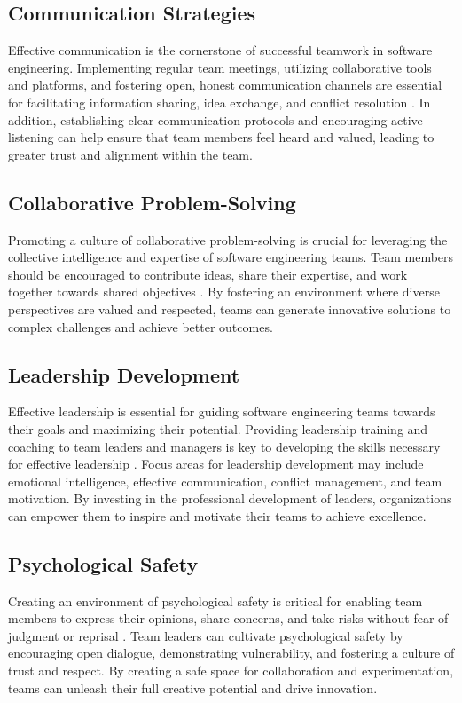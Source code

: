 \documentclass{article}
\begin{document}
\subsection{Communication Strategies}
Effective communication is the cornerstone of successful teamwork in software engineering. Implementing regular team meetings, utilizing collaborative tools and platforms, and fostering open, honest communication channels are essential for facilitating information sharing, idea exchange, and conflict resolution \cite{Jehn1995}. In addition, establishing clear communication protocols and encouraging active listening can help ensure that team members feel heard and valued, leading to greater trust and alignment within the team.

\subsection{Collaborative Problem-Solving}
Promoting a culture of collaborative problem-solving is crucial for leveraging the collective intelligence and expertise of software engineering teams. Team members should be encouraged to contribute ideas, share their expertise, and work together towards shared objectives \cite{Sawyer2006}. By fostering an environment where diverse perspectives are valued and respected, teams can generate innovative solutions to complex challenges and achieve better outcomes.

\subsection{Leadership Development}
Effective leadership is essential for guiding software engineering teams towards their goals and maximizing their potential. Providing leadership training and coaching to team leaders and managers is key to developing the skills necessary for effective leadership \cite{Goleman1998}. Focus areas for leadership development may include emotional intelligence, effective communication, conflict management, and team motivation. By investing in the professional development of leaders, organizations can empower them to inspire and motivate their teams to achieve excellence.

\subsection{Psychological Safety}
Creating an environment of psychological safety is critical for enabling team members to express their opinions, share concerns, and take risks without fear of judgment or reprisal \cite{Edmondson1999}. Team leaders can cultivate psychological safety by encouraging open dialogue, demonstrating vulnerability, and fostering a culture of trust and respect. By creating a safe space for collaboration and experimentation, teams can unleash their full creative potential and drive innovation.
\end{document}
